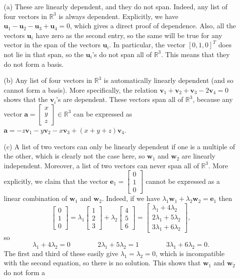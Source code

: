 \documentclass{amsart}
\newcommand{\R}         {{\mathbb{R}}}
\newcommand{\bsm}       {\left[\begin{smallmatrix}}
\newcommand{\esm}       {\end{smallmatrix}\right]}
\newcommand{\lm}        {\lambda}
\newcommand{\va}        {\mathbf{a}}
\newcommand{\ve}        {\mathbf{e}}
\newcommand{\vu}        {\mathbf{u}}
\newcommand{\vv}        {\mathbf{v}}
\newcommand{\vw}        {\mathbf{w}}
\renewcommand{\:}       {\colon}
\theoremstyle{definition}
\renewenvironment{solution}{\SolutionAtEnd}{\endSolutionAtEnd}
\begin{document}
\begin{solution}
 \begin{itemize}
  \item[(a)] These are linearly dependent, and they do not span.  
   Indeed, any list of four vectors in $\R^3$ is always dependent.
   Explicitly, we have $\vu_1-\vu_2-\vu_3+\vu_4=0$, which gives a
   direct proof of dependence.  Also, all the vectors $\vu_i$ have
   zero as the second entry, so the same will be true for any vector
   in the span of the vectors $\vu_i$.  In particular, the vector
   $[0,1,0]^T$ does not lie in that span, so the $\vu_i$'s do not span
   all of $\R^3$.  This means that they do not form a basis.
  \item[(b)] Any list of four vectors in $\R^3$ is
   automatically linearly dependent (and so cannot form a
   basis).  More specifically, the relation
   $\vv_1+\vv_2+\vv_3-2\vv_4=0$ shows that the $\vv_i$'s are
   dependent.  These vectors span all of $\R^3$, because any
   vector $\va=\bsm x\\ y\\ z\esm\in\R^3$ can be expressed
   as $\va=-z\vv_1-y\vv_2-x\vv_3+(x+y+z)\vv_4$.
  \item[(c)] A list of two vectors can only be linearly
   dependent if one is a multiple of the other, which is
   clearly not the case here, so $\vw_1$ and $\vw_2$ are
   linearly independent.  Moreover, a list of two vectors
   can never span all of $\R^3$.  More explicitly, we claim that the
   vector $\ve_1=\bsm 0\\1\\0\esm$ cannot be expressed as a linear
   combination of $\vw_1$ and $\vw_2$.  Indeed, if we have
   $\lm_1\vw_1+\lm_2\vw_2=\ve_1$ then
   \[ \bsm 0\\1\\0\esm =
       \lm_1\bsm 1\\2\\3\esm + \lm_2\bsm 4\\5\\6\esm = 
       \bsm \lm_1+4\lm_2 \\ 2\lm_1+5\lm_2 \\ 3\lm_1 + 6\lm_2 \esm,
   \]
   so 
   \[ \lm_1 + 4\lm_2 = 0 \hspace{4em}
      2\lm_1 + 5\lm_2 = 1 \hspace{4em}
      3\lm_1 + 6\lm_2 = 0.
   \]
   The first and third of these easily give $\lm_1=\lm_2=0$, which is
   incompatible with the second equation, so there is no solution.
   This shows that $\vw_1$ and $\vw_2$ do not form a

\end{itemize}
\end{solution}
\end{document}
